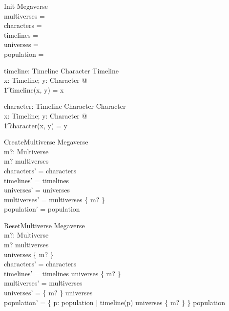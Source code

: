 \documentclass{article}
\begin{document}
\begin{schema}{Init}
Megaverse \\ 
\where
multiverses = \emptyset \\
characters = \emptyset \\ 
timelines = \emptyset \\
universes = \emptyset \\
population = \emptyset \\
\end{schema}

\begin{axdef}
timeline: Timeline \cross Character \fun Timeline \\
\where
\forall x: Timeline; y: Character @ \\
\t1 timeline(x, y) = x \\
\end{axdef}

\begin{axdef}
character: Timeline \cross Character \fun Character \\
\where
\forall x: Timeline; y: Character @ \\
\t1 character(x, y) = y \\
\end{axdef} 

\begin{schema}{CreateMultiverse}
\Delta Megaverse \\
m?: Multiverse \\
\where
m? \notin multiverses \\
characters' = characters \\
timelines' = timelines \\
universes' = universes \\
multiverses' = multiverses \cup \{ m? \} \\ 
population' = population \\
\end{schema}

\begin{schema}{ResetMultiverse}
\Delta Megaverse \\
m?: Multiverse \\
\where
m? \in multiverses \\
universes \limg \{ m? \} \rimg \neq \emptyset \\
characters' = characters \\
timelines' = timelines \setminus universes \limg \{ m? \} \rimg   \\
multiverses' = multiverses \\
universes' = \{ m? \} \ndres universes \\
population' = \{ p: \dom population | timeline(p) \in universes \limg \{ m? \} \rimg \} \ndres population \\
\end{schema} 
\end{document}

